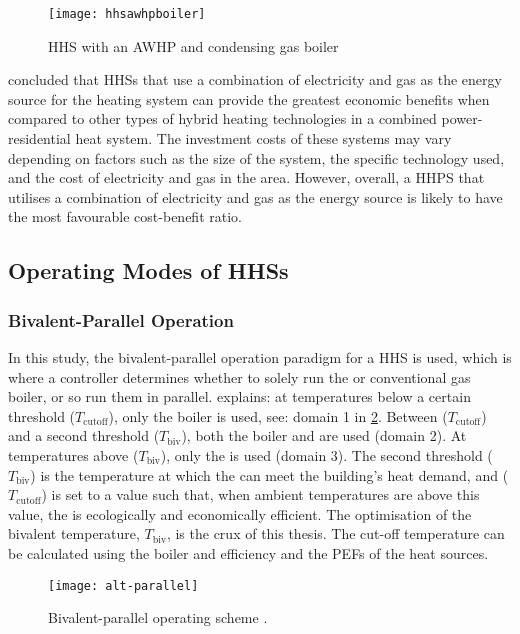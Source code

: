 \begin{figure}[htb]
    \centering
    \texttt{[image: hhsawhpboiler]}
    \caption{\acs{HHS} with an \acs{AWHP} and condensing gas boiler \cite{dongellini_influence_2021}}
    \label{fig:hhsawhpboilerdiagram}
\end{figure}

\citeauthor{heinen_electricity_2016} \cite{heinen_electricity_2016} concluded that \acp{HHS} that use a combination of electricity and gas as the energy source for the heating system can provide the greatest economic benefits when compared to other types of hybrid heating technologies in a combined power-residential heat system. The investment costs of these systems may vary depending on factors such as the size of the system, the specific technology used, and the cost of electricity and gas in the area. However, overall, a \ac{HHPS} that utilises a combination of electricity and gas as the energy source is likely to have the most favourable cost-benefit ratio.


\subsection{Operating Modes of \acsp{HHS}}

\subsubsection{Bivalent-Parallel Operation}
\label{subsubsec:biv-parallelop}
In this study, the bivalent-parallel operation paradigm for a \ac{HHS} is used, which is where a controller determines whether to solely run the \HP or conventional gas boiler, or so run them in parallel. \citeauthor{buday_2014} \cite{buday_2014} explains: at temperatures below a certain threshold ($T_\text{cutoff}$), only the boiler is used, see: domain 1 in \cref{fig:alt-parallel}. Between ($T_\text{cutoff}$) and a second threshold ($T_\text{biv}$), both the boiler and \HP are used (domain 2). At temperatures above ($T_\text{biv}$), only the \HP is used (domain 3). The second threshold ($T_\text{biv}$) is the temperature at which the \HP can meet the building's heat demand, and ($T_\text{cutoff}$) is set to a value such that, when ambient temperatures are above this value, the \HP is ecologically and economically efficient. The optimisation of the bivalent temperature, $T_\text{biv}$, is the crux of this thesis. The cut-off temperature can be calculated using the boiler and \HP efficiency and the \acp{PEF} of the heat sources. 
\begin{figure}[htb]
    \centering
    \texttt{[image: alt-parallel]}
    \caption{Bivalent-parallel operating scheme \cite{klein_numerical_2014}.}
    \label{fig:alt-parallel}
\end{figure}

